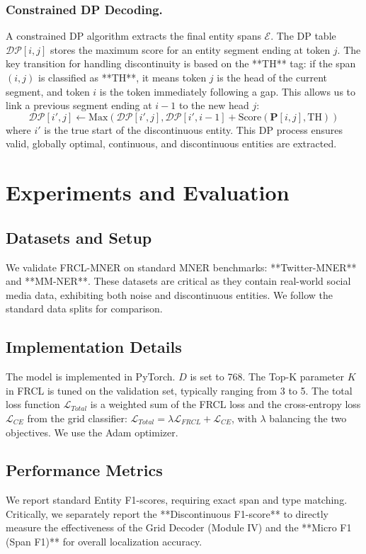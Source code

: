 \documentclass[runningheads]{llncs}
\begin{document}
\subsubsection{Constrained DP Decoding.}
A constrained DP algorithm extracts the final entity spans $\mathcal{E}$. The DP table $\mathcal{DP}[i, j]$ stores the maximum score for an entity segment ending at token $j$. The key transition for handling discontinuity is based on the **TH** tag: if the span $(i, j)$ is classified as **TH**, it means token $j$ is the head of the current segment, and token $i$ is the token immediately following a gap. This allows us to link a previous segment ending at $i-1$ to the new head $j$:
$$
\mathcal{DP}[i', j] \leftarrow \text{Max}\left(\mathcal{DP}[i', j], \mathcal{DP}[i', i-1] + \text{Score}(\mathbf{P}[i, j], \text{TH})\right)
$$
where $i'$ is the true start of the discontinuous entity. This DP process ensures valid, globally optimal, continuous, and discontinuous entities are extracted.


\section{Experiments and Evaluation}

\subsection{Datasets and Setup}
We validate FRCL-MNER on standard MNER benchmarks: **Twitter-MNER** and **MM-NER**. These datasets are critical as they contain real-world social media data, exhibiting both noise and discontinuous entities. We follow the standard data splits for comparison.

\subsection{Implementation Details}
The model is implemented in PyTorch. $D$ is set to 768. The Top-K parameter $K$ in FRCL is tuned on the validation set, typically ranging from 3 to 5. The total loss function $\mathcal{L}_{Total}$ is a weighted sum of the FRCL loss and the cross-entropy loss $\mathcal{L}_{CE}$ from the grid classifier: $\mathcal{L}_{Total} = \lambda \mathcal{L}_{FRCL} + \mathcal{L}_{CE}$, with $\lambda$ balancing the two objectives. We use the Adam optimizer.

\subsection{Performance Metrics}
We report standard Entity F1-scores, requiring exact span and type matching. Critically, we separately report the **Discontinuous F1-score** to directly measure the effectiveness of the Grid Decoder (Module IV) and the **Micro F1 (Span F1)** for overall localization accuracy.
\end{document}
